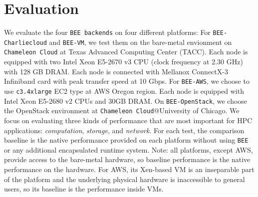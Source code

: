 \section{Evaluation}
\label{evaluation-section}
We evaluate the four \texttt{BEE backends} on four different platforms: For \texttt{BEE-Charliecloud}
and \texttt{BEE-VM}, we test them on the bare-metal envionment on \texttt{Chameleon Cloud} at Texas Advanced Computing Center (TACC). Each node is equipped with two Intel Xeon E5-2670 v3 CPU (clock frequency at 2.30 GHz) with 128 GB DRAM. Each node is connected with Mellanox ConnectX-3 Infiniband card with peak transfer speed at 10 Gbps.  For \texttt{BEE-AWS}, we choose to use \texttt{c3.4xlarge} EC2 type at AWS Oregon region. Each node is equipped with Intel Xeon E5-2680 v2 CPUs and 30GB DRAM. On \texttt{BEE-OpenStack}, we choose the OpenStack environment at \texttt{Chameleon Cloud}@University of Chicago. We focus on evaluating three kinds of performance that are most important for HPC applications: \textit{computation}, \textit{storage}, and \textit{network}. For each test, the comparison baseline is the native performance provided on each platform without using \texttt{BEE} or any additional encapsulated runtime system. Note: all platforms, except AWS, provide access to the bare-metal hardware, so baseline performance is the native performance on the hardware. For AWS, its Xen-based VM is an inseparable part of the platform and the underlying physical hardware is inaccessible to general users, so its baseline is the performance inside VMs.

